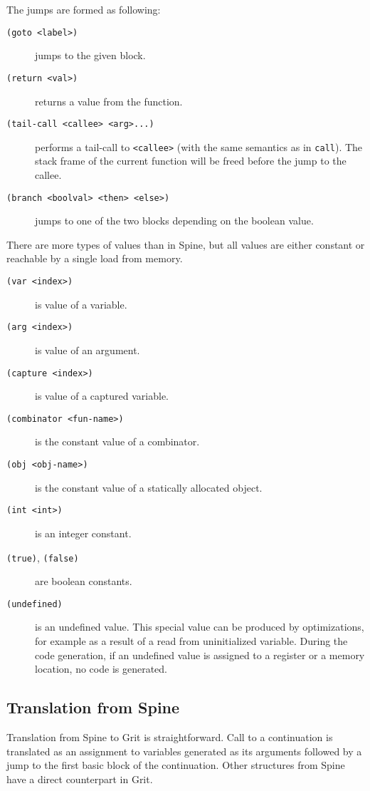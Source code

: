 The jumps are formed as following:

\begin{description}
  \item[\texttt{(goto <label>)}] jumps to the given block.
  \item[\texttt{(return <val>)}] returns a value from the function.
  \item[\texttt{(tail-call <callee> <arg>...)}] performs a tail-call to
    \texttt{<callee>} (with the same semantics as in \texttt{call}). The stack
    frame of the current function will be freed before the jump to the callee.
  \item[\texttt{(branch <boolval> <then> <else>)}] jumps to one of the two
    blocks depending on the boolean value.
\end{description}

There are more types of values than in Spine, but all values are either constant
or reachable by a single load from memory.

\begin{description}
  \item[\texttt{(var <index>)}] is value of a variable.
  \item[\texttt{(arg <index>)}] is value of an argument.
  \item[\texttt{(capture <index>)}] is value of a captured variable.
  \item[\texttt{(combinator <fun-name>)}] is the constant value of a combinator.
  \item[\texttt{(obj <obj-name>)}] is the constant value of a statically
    allocated object.
  \item[\texttt{(int <int>)}] is an integer constant.
  \item[\texttt{(true)}, \texttt{(false)}] are boolean constants.
  \item[\texttt{(undefined)}] is an undefined value. This special value can be
    produced by optimizations, for example as a result of a read from
    uninitialized variable. During the code generation, if an undefined value is
    assigned to a register or a memory location, no code is generated.
\end{description}

\subsection{Translation from Spine}

Translation from Spine to Grit is straightforward. Call to a continuation is
translated as an assignment to variables generated as its arguments followed by
a jump to the first basic block of the continuation. Other structures from Spine
have a direct counterpart in Grit.

